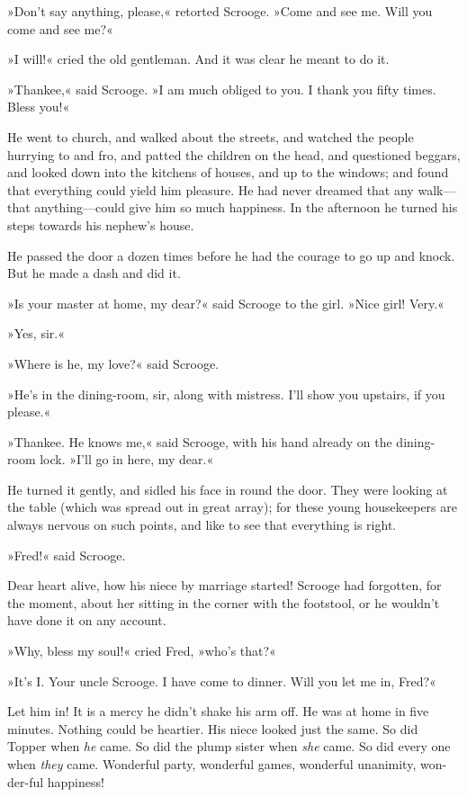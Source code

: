»Don't say anything, please,« retorted Scrooge. »Come and see me. Will you come and see me?«

»I will!« cried the old gentleman. And it was clear he meant to do it.

»Thankee,« said Scrooge. »I am much obliged to you. I thank you fifty times. Bless you!«

He went to church, and walked about the streets, and watched the people hurrying to and fro, and patted the children on the head, and questioned beggars, and looked down into the kitchens of houses, and up to the windows; and found that everything could yield him pleasure. He had never dreamed that any walk—that anything—could give him so much happiness. In the afternoon he turned his steps towards his nephew's house.

He passed the door a dozen times before he had the courage to go up and knock. But he made a dash and did it.

»Is your master at home, my dear?« said Scrooge to the girl. »Nice girl! Very.«

»Yes, sir.«

»Where is he, my love?« said Scrooge.

»He's in the dining-room, sir, along with mistress. I'll show you upstairs, if you please.«

»Thankee. He knows me,« said Scrooge, with his hand already on the dining-room lock. »I'll go in here, my dear.«

He turned it gently, and sidled his face in round the door. They were looking at the table (which was spread out in great array); for these young housekeepers are always nervous on such points, and like to see that everything is right.

»Fred!« said Scrooge.

Dear heart alive, how his niece by marriage started! Scrooge had forgotten, for the moment, about her sitting in the corner with the footstool, or he wouldn't have done it on any account.

»Why, bless my soul!« cried Fred, »who's that?«

»It's I. Your uncle Scrooge. I have come to dinner. Will you let me in, Fred?«

Let him in! It is a mercy he didn't shake his arm off. He was at home in five minutes. Nothing could be heartier. His niece looked just the same. So did Topper when \textit{he} came. So did the plump sister when \textit{she} came. So did every one when \textit{they} came. Wonderful party, wonderful games, wonderful unanimity, won-der-ful happiness!

